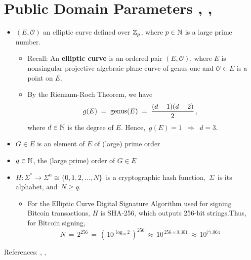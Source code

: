 
\section{Public Domain Parameters \cite{Yan2013}, \cite{Paar2010}, \cite{Garrett2005}}
\setcounter{theorem}{0}
\setcounter{equation}{0}


\begin{itemize}
\item
	$(E,\mathcal{O})$ an elliptic curve defined over $\mathbb{Z}_{p}$, where $p \in \mathbb{N}$ is a large prime number.
	\begin{itemize}
	\item
		Recall: An \textbf{elliptic curve} is an ordered pair $(E,\mathcal{O})$,
		where $E$ is nonsingular projective algebraic plane curve of genus one and
		$\mathcal{O} \in E$ is a point on $E$.
	\item
		By the Riemann-Roch Theorem, we have
		\begin{equation*}
		g(E) \; = \; \textnormal{genus}(E) \; = \; \dfrac{(d-1)(d-2)}{2}\,,
		\end{equation*}
		where $d \in \mathbb{N}$ is the degree of $E$.
		Hence, \,$g(E) = 1$\, $\Longrightarrow$ \,$d = 3$.\,
	\end{itemize}
\item
	$G \in E$ is an element of $E$ of (large) prime order
\item
	$q \in \mathbb{N}$, the (large prime) order of $G \in E$
\item
	$H : \Sigma^{*} \longrightarrow \Sigma^{n} \cong \{0,1,2,\ldots,N\}$\,
	is a cryptographic hash function,
	\,$\Sigma$\, is its alphabet, and \,$N \geq q$.
	\begin{itemize}
	\item
		For the Elliptic Curve Digital Signature Algorithm used for signing Bitcoin transactions,
		$H$ is SHA-256, which outputs 256-bit strings.Thus, for Bitcoin signing,
		\begin{equation*}
		N \, = \, 2^{256} \, = \, \left(\,10^{\,\log_{10}2}\,\right)^{256}
		\, \approx \, 10^{\,256 \times 0.301} \, \approx \, 10^{77.064}
		\end{equation*}
	\end{itemize}
\end{itemize}

\vskip 0.0cm
\noindent
References: \cite{Yan2013}, \cite{Paar2010}, \cite{Garrett2005}
